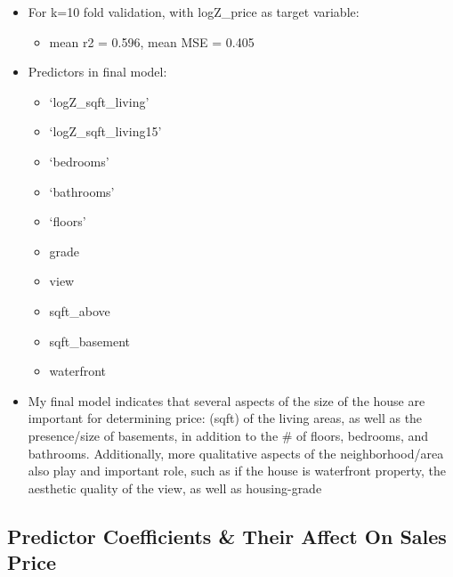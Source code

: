 \documentclass[11pt]{article}
\providecommand{\tightlist}{%
      \setlength{\itemsep}{0pt}\setlength{\parskip}{0pt}}
\begin{document}
\begin{itemize}
\tightlist
\item
  For k=10 fold validation, with logZ\_price as target variable:

  \begin{itemize}
  \tightlist
  \item
    mean r2 = 0.596, mean MSE = 0.405
  \end{itemize}
\item
  Predictors in final model:

  \begin{itemize}
  \tightlist
  \item
    `logZ\_sqft\_living'
  \item
    `logZ\_sqft\_living15'
  \item
    `bedrooms'
  \item
    `bathrooms'
  \item
    `floors'
  \item
    grade
  \item
    view
  \item
    sqft\_above
  \item
    sqft\_basement
  \item
    waterfront
  \end{itemize}
\item
  My final model indicates that several aspects of the size of the house
  are important for determining price: (sqft) of the living areas, as
  well as the presence/size of basements, in addition to the \# of
  floors, bedrooms, and bathrooms. Additionally, more qualitative
  aspects of the neighborhood/area also play and important role, such as
  if the house is waterfront property, the aesthetic quality of the
  view, as well as housing-grade
\end{itemize}

    \hypertarget{predictor-coefficients-their-affect-on-sales-price}{%
\subsection{Predictor Coefficients \& Their Affect On Sales
Price}\label{predictor-coefficients-their-affect-on-sales-price}}
\end{document}
